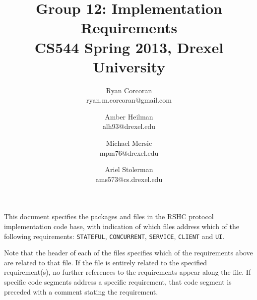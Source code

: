 \documentclass[12pt]{usenixsubmit}
\begin{document}

\title{Group 12: Implementation Requirements \\ \Large{CS544 Spring 2013, Drexel University}}

\author{
    Ryan Corcoran \\
    ryan.m.corcoran@gmail.com
    \and
    Amber Heilman \\
    alh93@drexel.edu
    \and
    Michael Mersic \\
    mpm76@drexel.edu
    \and
    Ariel Stolerman \\
    ams573@cs.drexel.edu
}
\date{}

\maketitle


This document specifies the packages and files in the RSHC protocol implementation code base, with indication of which files address which of the following requirements: {\tt STATEFUL}, {\tt CONCURRENT}, {\tt SERVICE}, {\tt CLIENT} and {\tt UI}.

Note that the header of each of the files specifies which of the requirements above are related to that file. If the file is entirely related to the specified requirement(s), no further references to the requirements appear along the file. If specific code segments address a specific requirement, that code segment is preceded with a comment stating the requirement.
\end{document}
